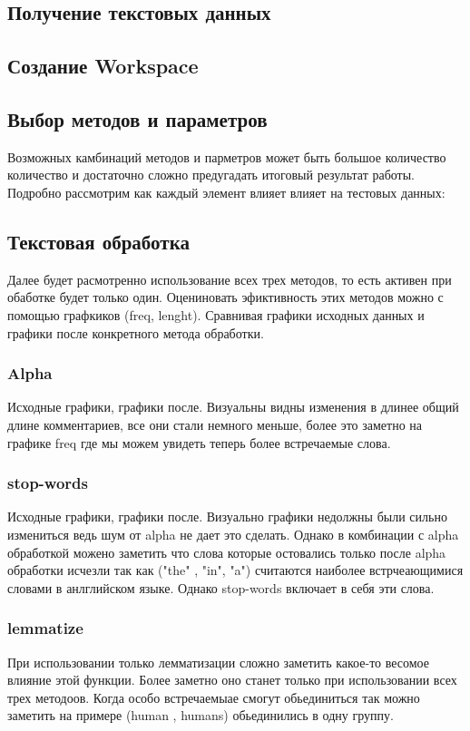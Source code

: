 	\subsection{Получение текстовых данных}
		
	\subsection{Создание Workspace}
		
	\subsection{Выбор методов и параметров} 
		Возможных камбинаций методов и парметров может быть большое количество количество и достаточно сложно предугадать итоговый результат работы. Подробно рассмотрим как каждый элемент влияет влияет на тестовых данных:
		
	\subsection{Текстовая обработка} 
		Далее будет расмотренно использование всех трех методов, то есть активен при обаботке будет только один. Оцениновать эфиктивность этих методов можно с помощью графкиков (freq, lenght). Сравнивая графики исходных данных и графики после конкретного метода обработки.
		
		\subsubsection{Alpha}
			Исходные графики, графики после. Визуальны видны изменения в длинее общий длине комментариев, все они стали немного меньше, более это заметно на графике freq где мы можем увидеть теперь более встречаемые слова. 
				
				
		\subsubsection{stop-words}
			Исходные графики, графики после. Визуально графики недолжны были сильно измениться ведь шум от alpha не дает это сделать. Однако в комбинации с alpha обработкой можено заметить что слова которые остовались только после alpha обработки исчезли так как ("the" , "in", "a") считаются наиболее встрчеающимися словами в анлглийском языке. Однако stop-words включает в себя эти слова.
			
		\subsubsection{lemmatize}
			При использовании только лемматизации сложно заметить какое-то весомое влияние этой функции.
			Более заметно оно станет только при использовании всех трех методоов. Когда особо встречаемыае смогут обьединиться так можно заметить на примере (human , humans) обьединились в одну группу.
			
